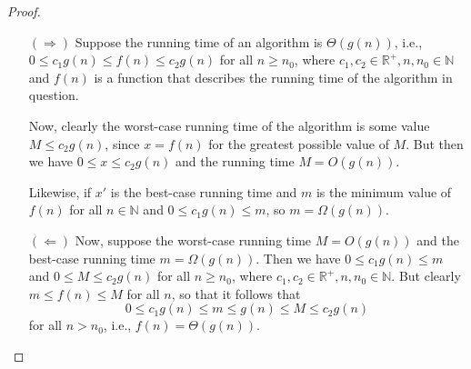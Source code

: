 
\begin{proof}
    \begin{itemize}
        \item[$(\Rightarrow)$] Suppose the running time of an algorithm is 
            $\Theta(g(n))$, i.e., $0 \leq c_1 g(n) \leq f(n) \leq c_2 g(n)$ for all 
            $n \geq n_0$, where $c_1, c_2 \in \mathbb{R}^+, n, n_0 \in \mathbb{N}$ and 
            $f(n)$ is a function that describes the running time of the algorithm 
            in question. 

            Now, clearly the worst-case running time of the algorithm is some value 
            $M \leq c_2 g(n)$, since $x = f(n)$ for the greatest possible value of $M$. 
            But then we have $0 \leq x \leq c_2 g(n)$ and the running time $M = O(g(n))$. 

            Likewise, if $x'$ is the best-case running time and $m$ is the minimum value 
            of $f(n)$ for all $n \in \mathbb{N}$ and $0 \leq c_1 g(n) \leq m$, so 
            $m = \Omega(g(n))$.
        \item[$(\Leftarrow)$] Now, suppose the worst-case running time $M = O(g(n))$ and
            the best-case running time $m = \Omega(g(n))$. Then we have
            $0 \leq c_1 g(n) \leq m$ and $0 \leq M \leq c_2 g(n)$ for all $n \geq n_0$,
            where $c_1, c_2 \in \mathbb{R}^+, n, n_0 \in \mathbb{N}$. But clearly
            $m \leq f(n) \leq M$ for all $n$, so that it follows that
            \[
                0 \leq c_1 g(n) \leq m \leq g(n) \leq M \leq c_2 g(n)
            \]
            for all $n > n_0$, i.e., $f(n) = \Theta(g(n))$. 
    \end{itemize} 
\end{proof}
